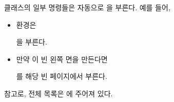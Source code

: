 클래스의 일부 명령들은 자동으로 \cmd{\thispagestyle}을 부른다.
예를 들어,
\begin{itemize}
\item {} 환경은
      \begin{lcode}
\thispagestyle{titlingpagestyle}
      \end{lcode} 
      을 부른다.
\item 만약 \cmd{\cleardoublepage} 이 빈 왼쪽 면을 만든다면
      \begin{lcode}
\thispagestyle{cleared}
      \end{lcode}
      를 해당 빈 페이지에서 부른다.
\end{itemize}
참고로, 전체 목록은 에 주어져 있다.

